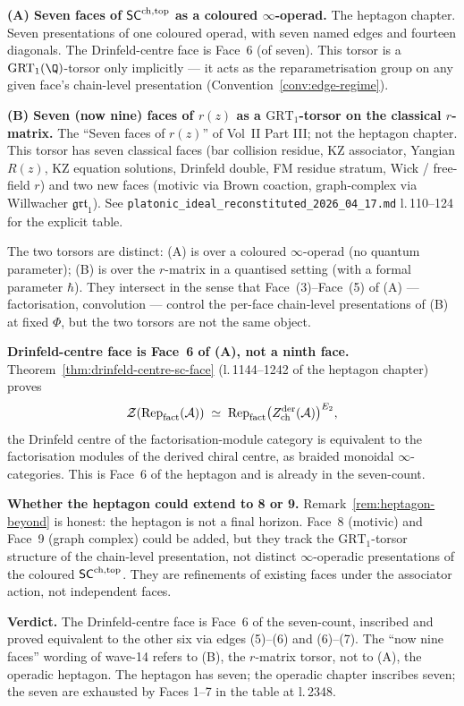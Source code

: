 \textbf{(A) Seven faces of $\mathsf{SC}^{\mathrm{ch},\mathrm{top}}$ as a coloured $\infty$-operad.} The heptagon chapter. Seven presentations of one coloured operad, with seven named edges and fourteen diagonals. The Drinfeld-centre face is Face~6 (of seven). This torsor is a $\mathrm{GRT}_1(\Q)$-torsor only implicitly --- it acts as the reparametrisation group on any given face's chain-level presentation (Convention~\ref*{conv:edge-regime}).

\textbf{(B) Seven (now nine) faces of $r(z)$ as a $\mathrm{GRT}_1$-torsor on the classical $r$-matrix.} The ``Seven faces of $r(z)$'' of Vol~II Part III; not the heptagon chapter. This torsor has seven classical faces (bar collision residue, KZ associator, Yangian $R(z)$, KZ equation solutions, Drinfeld double, FM residue stratum, Wick / free-field $r$) and two new faces (motivic via Brown coaction, graph-complex via Willwacher $\mathfrak{grt}_1$). See \texttt{platonic\_ideal\_reconstituted\_2026\_04\_17.md} l.\,110--124 for the explicit table.

The two torsors are distinct: (A) is over a coloured $\infty$-operad (no quantum parameter); (B) is over the $r$-matrix in a quantised setting (with a formal parameter $\hbar$). They intersect in the sense that Face~(3)--Face~(5) of (A) --- factorisation, convolution --- control the per-face chain-level presentations of (B) at fixed $\Phi$, but the two torsors are not the same object.

\textbf{Drinfeld-centre face is Face~6 of (A), not a ninth face.} Theorem~\ref*{thm:drinfeld-centre-sc-face} (l.\,1144--1242 of the heptagon chapter) proves
\[
\mathcal{Z}(\mathrm{Rep}_{\mathrm{fact}}(\mathcal{A})) \;\simeq\; \mathrm{Rep}_{\mathrm{fact}}\bigl(Z^{\mathrm{der}}_{\mathrm{ch}}(\mathcal{A})\bigr)^{E_2},
\]
the Drinfeld centre of the factorisation-module category is equivalent to the factorisation modules of the derived chiral centre, as braided monoidal $\infty$-categories. This is Face~6 of the heptagon and is already in the seven-count.

\textbf{Whether the heptagon could extend to 8 or 9.} Remark~\ref*{rem:heptagon-beyond} is honest: the heptagon is not a final horizon. Face~8 (motivic) and Face~9 (graph complex) could be added, but they track the $\mathrm{GRT}_1$-torsor structure of the chain-level presentation, not distinct $\infty$-operadic presentations of the coloured $\mathsf{SC}^{\mathrm{ch},\mathrm{top}}$. They are refinements of existing faces under the associator action, not independent faces.

\textbf{Verdict.} The Drinfeld-centre face is Face~6 of the seven-count, inscribed and proved equivalent to the other six via edges (5)--(6) and (6)--(7). The ``now nine faces'' wording of wave-14 refers to (B), the $r$-matrix torsor, not to (A), the operadic heptagon. The heptagon has seven; the operadic chapter inscribes seven; the seven are exhausted by Faces 1--7 in the table at l.\,2348.

